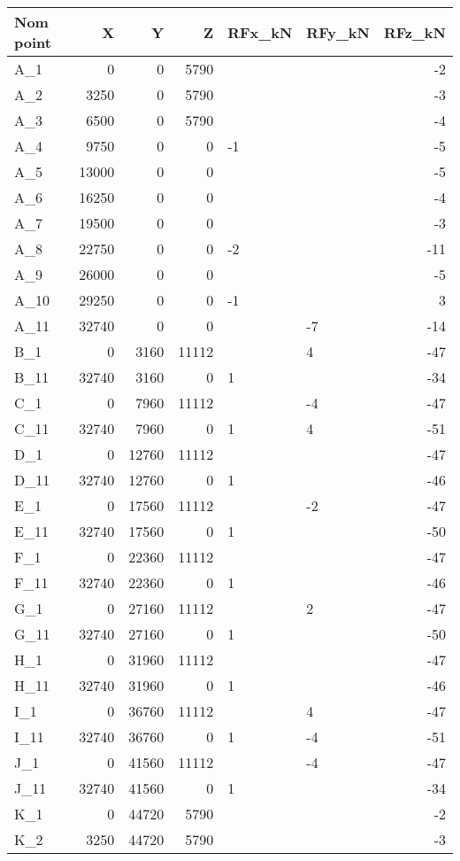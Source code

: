 \begin{tabular}{lrrrllr}
\toprule
Nom point & X & Y & Z & RFx\_kN & RFy\_kN & RFz\_kN \\
\midrule
A\_1 & 0 & 0 & 5790 &  &  & -2 \\
A\_2 & 3250 & 0 & 5790 &  &  & -3 \\
A\_3 & 6500 & 0 & 5790 &  &  & -4 \\
A\_4 & 9750 & 0 & 0 & -1 &  & -5 \\
A\_5 & 13000 & 0 & 0 &  &  & -5 \\
A\_6 & 16250 & 0 & 0 &  &  & -4 \\
A\_7 & 19500 & 0 & 0 &  &  & -3 \\
A\_8 & 22750 & 0 & 0 & -2 &  & -11 \\
A\_9 & 26000 & 0 & 0 &  &  & -5 \\
A\_10 & 29250 & 0 & 0 & -1 &  & 3 \\
A\_11 & 32740 & 0 & 0 &  & -7 & -14 \\
B\_1 & 0 & 3160 & 11112 &  & 4 & -47 \\
B\_11 & 32740 & 3160 & 0 & 1 &  & -34 \\
C\_1 & 0 & 7960 & 11112 &  & -4 & -47 \\
C\_11 & 32740 & 7960 & 0 & 1 & 4 & -51 \\
D\_1 & 0 & 12760 & 11112 &  &  & -47 \\
D\_11 & 32740 & 12760 & 0 & 1 &  & -46 \\
E\_1 & 0 & 17560 & 11112 &  & -2 & -47 \\
E\_11 & 32740 & 17560 & 0 & 1 &  & -50 \\
F\_1 & 0 & 22360 & 11112 &  &  & -47 \\
F\_11 & 32740 & 22360 & 0 & 1 &  & -46 \\
G\_1 & 0 & 27160 & 11112 &  & 2 & -47 \\
G\_11 & 32740 & 27160 & 0 & 1 &  & -50 \\
H\_1 & 0 & 31960 & 11112 &  &  & -47 \\
H\_11 & 32740 & 31960 & 0 & 1 &  & -46 \\
I\_1 & 0 & 36760 & 11112 &  & 4 & -47 \\
I\_11 & 32740 & 36760 & 0 & 1 & -4 & -51 \\
J\_1 & 0 & 41560 & 11112 &  & -4 & -47 \\
J\_11 & 32740 & 41560 & 0 & 1 &  & -34 \\
K\_1 & 0 & 44720 & 5790 &  &  & -2 \\
K\_2 & 3250 & 44720 & 5790 &  &  & -3 \\

\end{tabular}
